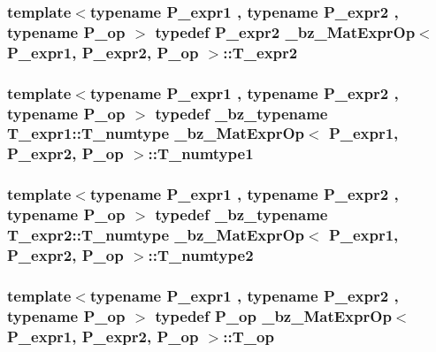 \subsubsection[{T\+\_\+expr2}]{\setlength{\rightskip}{0pt plus 5cm}template$<$typename P\+\_\+expr1 , typename P\+\_\+expr2 , typename P\+\_\+op $>$ typedef P\+\_\+expr2 {\bf \+\_\+bz\+\_\+\+Mat\+Expr\+Op}$<$ P\+\_\+expr1, P\+\_\+expr2, P\+\_\+op $>$\+::{\bf T\+\_\+expr2}}\label{class__bz__MatExprOp_ac564f43a14624f056bfc381f36d4e854}
\hypertarget{class__bz__MatExprOp_a6a6a0f1736a11b0e5df0a11543191e5c}{}
\subsubsection[{T\+\_\+numtype1}]{\setlength{\rightskip}{0pt plus 5cm}template$<$typename P\+\_\+expr1 , typename P\+\_\+expr2 , typename P\+\_\+op $>$ typedef {\bf \+\_\+bz\+\_\+typename} T\+\_\+expr1\+::\+T\+\_\+numtype {\bf \+\_\+bz\+\_\+\+Mat\+Expr\+Op}$<$ P\+\_\+expr1, P\+\_\+expr2, P\+\_\+op $>$\+::{\bf T\+\_\+numtype1}}\label{class__bz__MatExprOp_a6a6a0f1736a11b0e5df0a11543191e5c}
\hypertarget{class__bz__MatExprOp_a377d342efc7b8a0f5626a9de9293b2c9}{}
\subsubsection[{T\+\_\+numtype2}]{\setlength{\rightskip}{0pt plus 5cm}template$<$typename P\+\_\+expr1 , typename P\+\_\+expr2 , typename P\+\_\+op $>$ typedef {\bf \+\_\+bz\+\_\+typename} T\+\_\+expr2\+::\+T\+\_\+numtype {\bf \+\_\+bz\+\_\+\+Mat\+Expr\+Op}$<$ P\+\_\+expr1, P\+\_\+expr2, P\+\_\+op $>$\+::{\bf T\+\_\+numtype2}}\label{class__bz__MatExprOp_a377d342efc7b8a0f5626a9de9293b2c9}
\hypertarget{class__bz__MatExprOp_adf09ab505f7ad6afb77aa4c9fc50ef3e}{}
\subsubsection[{T\+\_\+op}]{\setlength{\rightskip}{0pt plus 5cm}template$<$typename P\+\_\+expr1 , typename P\+\_\+expr2 , typename P\+\_\+op $>$ typedef P\+\_\+op {\bf \+\_\+bz\+\_\+\+Mat\+Expr\+Op}$<$ P\+\_\+expr1, P\+\_\+expr2, P\+\_\+op $>$\+::{\bf T\+\_\+op}}\label{class__bz__MatExprOp_adf09ab505f7ad6afb77aa4c9fc50ef3e}


